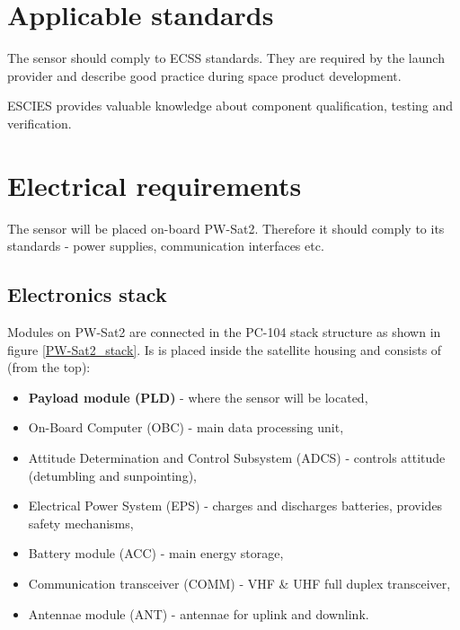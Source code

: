 \section{Applicable standards}
    The sensor should comply to ECSS \cite{ECSS_URL} standards. They are required by the launch provider and describe good practice during space product development.

    ESCIES \cite{ESCIES_URL} provides valuable knowledge about component qualification, testing and verification.

\section{Electrical requirements}
    The sensor will be placed on-board PW-Sat2. Therefore it should comply to its standards - power supplies, communication interfaces etc.

    \subsection{Electronics stack}
        Modules on PW-Sat2 are connected in the PC-104 stack structure as shown in figure \ref{PW-Sat2_stack}. Is is placed inside the satellite housing and consists of (from the top):
        \begin{itemize}
            \item \textbf{Payload module (PLD)} - where the sensor will be located,
            \item On-Board Computer (OBC) - main data processing unit,
            \item Attitude Determination and Control Subsystem (ADCS) - controls attitude (detumbling and sunpointing),
            \item Electrical Power System (EPS) - charges and discharges batteries, provides safety mechanisms,
            \item Battery module (ACC) - main energy storage,
            \item Communication transceiver (COMM) - VHF \& UHF full duplex transceiver,
            \item Antennae module (ANT) - antennae for uplink and downlink.
        \end{itemize}

